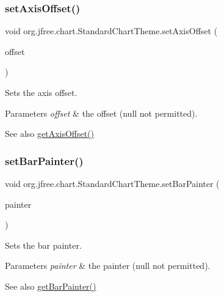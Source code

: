 \subsubsection{\texorpdfstring{set\+Axis\+Offset()}{setAxisOffset()}}
{\footnotesize\ttfamily void org.\+jfree.\+chart.\+Standard\+Chart\+Theme.\+set\+Axis\+Offset (\begin{DoxyParamCaption}\item[{Rectangle\+Insets}]{offset }\end{DoxyParamCaption})}

Sets the axis offset.


\begin{DoxyParams}{Parameters}
{\em offset} & the offset ({\ttfamily null} not permitted).\\
\hline
\end{DoxyParams}
\begin{DoxySeeAlso}{See also}
\mbox{\hyperlink{classorg_1_1jfree_1_1chart_1_1_standard_chart_theme_a29b114f43a2036250c24fc8544e95282}{get\+Axis\+Offset()}} 
\end{DoxySeeAlso}
\mbox{\label{classorg_1_1jfree_1_1chart_1_1_standard_chart_theme_afba641eafa062852fef81ca19fd04cfe}} 
\subsubsection{\texorpdfstring{set\+Bar\+Painter()}{setBarPainter()}}
{\footnotesize\ttfamily void org.\+jfree.\+chart.\+Standard\+Chart\+Theme.\+set\+Bar\+Painter (\begin{DoxyParamCaption}\item[{\mbox{\hyperlink{interfaceorg_1_1jfree_1_1chart_1_1renderer_1_1category_1_1_bar_painter}{Bar\+Painter}}}]{painter }\end{DoxyParamCaption})}

Sets the bar painter.


\begin{DoxyParams}{Parameters}
{\em painter} & the painter ({\ttfamily null} not permitted).\\
\hline
\end{DoxyParams}
\begin{DoxySeeAlso}{See also}
\mbox{\hyperlink{classorg_1_1jfree_1_1chart_1_1_standard_chart_theme_a46efbe98dbf20d45f5ec7c27e8b4b03e}{get\+Bar\+Painter()}} 
\end{DoxySeeAlso}
\mbox{\label{classorg_1_1jfree_1_1chart_1_1_standard_chart_theme_af1e3ace3875efbd18d3505835ddcce5a}} 
